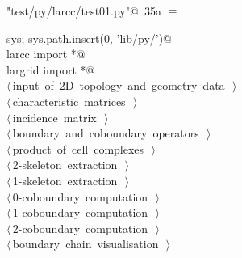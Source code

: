 \documentclass[11pt,oneside]{article}	%
\begin{document}
\begin{flushleft} \small
\begin{minipage}{\linewidth} \label{scrap60}
\protect{}\verb@"test/py/larcc/test01.py"@\nobreak\ {\footnotesize 35a }$\equiv$
\vspace{-1ex}
\begin{list}{}{} \item
\mbox{}\verb@import sys; sys.path.insert(0, 'lib/py/')@\\
\mbox{}\verb@from larcc import *@\\
\mbox{}\verb@from largrid import *@\\
\mbox{}\verb@@\hbox{$\langle\,$input of 2D topology and geometry data\nobreak\ {\footnotesize {}}$\,\rangle$}\verb@@\\
\mbox{}\verb@@\hbox{$\langle\,$characteristic matrices\nobreak\ {\footnotesize {}}$\,\rangle$}\verb@@\\
\mbox{}\verb@@\hbox{$\langle\,$incidence matrix\nobreak\ {\footnotesize {}}$\,\rangle$}\verb@@\\
\mbox{}\verb@@\hbox{$\langle\,$boundary and coboundary operators\nobreak\ {\footnotesize {}}$\,\rangle$}\verb@@\\
\mbox{}\verb@@\hbox{$\langle\,$product of cell complexes\nobreak\ {\footnotesize {}}$\,\rangle$}\verb@@\\
\mbox{}\verb@@\hbox{$\langle\,$2-skeleton extraction\nobreak\ {\footnotesize {}}$\,\rangle$}\verb@@\\
\mbox{}\verb@@\hbox{$\langle\,$1-skeleton extraction\nobreak\ {\footnotesize {}}$\,\rangle$}\verb@@\\
\mbox{}\verb@@\hbox{$\langle\,$0-coboundary computation\nobreak\ {\footnotesize {}}$\,\rangle$}\verb@@\\
\mbox{}\verb@@\hbox{$\langle\,$1-coboundary computation\nobreak\ {\footnotesize {}}$\,\rangle$}\verb@@\\
\mbox{}\verb@@\hbox{$\langle\,$2-coboundary computation\nobreak\ {\footnotesize {}}$\,\rangle$}\verb@@\\
\mbox{}\verb@@\hbox{$\langle\,$boundary chain visualisation\nobreak\ {\footnotesize {}}$\,\rangle$}\verb@@\\
\mbox{}\verb@@{\NWsep}
\end{list}
\vspace{-2ex}
\end{minipage}\\[4ex]
\end{flushleft}
\end{document}
